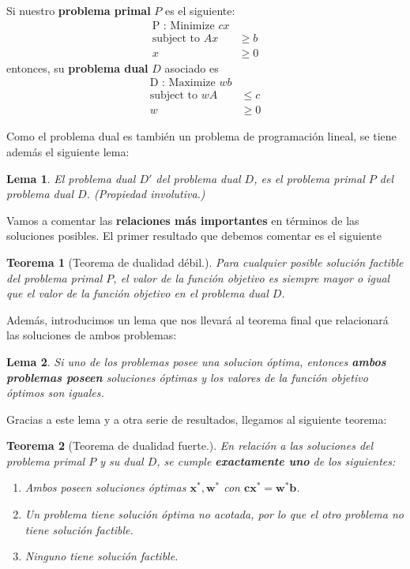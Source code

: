 \documentclass[a4paper]{article}
\newtheorem{thm}{Teorema}
\newtheorem{lema}{Lema}
\begin{document}
Si nuestro \textbf{problema primal} \(P\) es el siguiente:
\begin{align*}
\text{P : Minimize }  cx &\\
\text{subject to } Ax & \geq b\\
 x & \geq 0
\end{align*}
entonces, su \textbf{problema dual} \(D\) asociado es 
\begin{align*}
  \text{D : Maximize }  wb &\\
  \text{subject to }  wA & \leq c\\
   w & \geq 0
\end{align*}

Como el problema dual es también un problema de programación lineal, se tiene además el siguiente lema:

\begin{lema}
El problema dual \(D'\) del problema dual \(D\), es el problema primal \(P\) del problema dual \(D\). (\emph{Propiedad involutiva.})
\end{lema}

Vamos a comentar las \textbf{relaciones más importantes} en términos de las soluciones posibles. El primer resultado que debemos comentar es el siguiente

\begin{thm}[Teorema de dualidad débil.]
Para cualquier posible solución factible del problema primal \(P\), el valor de la función objetivo es siempre mayor o igual que el valor de la función objetivo en el problema dual \(D\). 
\end{thm}

Además, introducimos un lema que nos llevará al teorema final que relacionará las soluciones de ambos problemas:

\begin{lema}
Si uno de los problemas posee una solucion óptima, entonces \textbf{ambos problemas poseen} soluciones óptimas y los valores de la función objetivo óptimos son iguales.
\end{lema}

Gracias a este lema y a otra serie de resultados, llegamos al siguiente teorema:

\begin{thm}[Teorema de dualidad fuerte.]\label{th:dual}
En relación a las soluciones del problema primal \(P\) y su dual \(D\), se cumple \textbf{exactamente uno} de los siguientes:
\begin{enumerate}

\item Ambos poseen soluciones óptimas \(\mathbf{x}^*, \mathbf{w}^*\) con \(\mathbf{c}\mathbf{x}^* = \mathbf{w}^*\mathbf{b}\).
\item Un problema tiene solución óptima no acotada, por lo que el otro problema no tiene solución factible.
\item Ninguno tiene solución factible.
\end{enumerate}
\end{thm}
\end{document}
